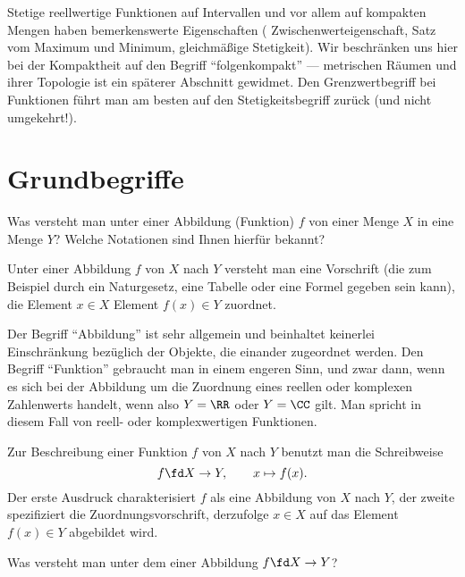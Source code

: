 Stetige reellwertige Funktionen auf Intervallen und vor allem auf  
kompakten Mengen haben bemerkenswerte Eigenschaften ({\zB} 
Zwischenwerteigenschaft, Satz vom Maximum und Minimum, 
gleichmäßige Stetigkeit). Wir beschränken uns hier bei der Kompaktheit 
auf den Begriff "`folgenkompakt"' --- metrischen Räumen und ihrer Topologie 
ist ein späterer Abschnitt gewidmet. Den Grenzwertbegriff bei Funktionen 
führt man am besten auf den Stetigkeitsbegriff zurück (und nicht umgekehrt!).  


\section{Grundbegriffe}

\begin{frage}
  \label{03_abdf}
  Was versteht man unter einer Abbildung (Funktion) $f$ von einer Menge 
  $X$ in eine Menge $Y$? Welche Notationen sind Ihnen hierfür bekannt?
\end{frage}

\begin{antwort}
  Unter einer Abbildung $f$ von $X$ nach $Y$ versteht man 
  eine Vorschrift 
  (die zum Beispiel durch ein Naturgesetz, 
  eine Tabelle oder eine Formel gegeben sein kann), die 
   Element $x\in X$  Element 
  $f(x) \in Y$ zuordnet. 

  Der Begriff "`Abbildung"' ist sehr allgemein und beinhaltet 
  keinerlei Einschränkung bezüglich der Objekte, die einander 
  zugeordnet werden. Den Begriff "`Funktion"' 
  gebraucht man in einem engeren Sinn, und zwar dann, wenn 
  es sich bei der Abbildung um die Zuordnung eines 
  reellen oder komplexen Zahlenwerts handelt, wenn also $Y=\RR$ 
  oder $Y=\CC$ gilt. Man spricht in diesem Fall von reell- oder 
  komplexwertigen Funktionen. 

  Zur Beschreibung einer Funktion $f$ von 
  $X$ nach $Y$ benutzt man die Schreibweise 
  \[
  f\fd X\to Y, \qquad x\mapsto f(x).
  \] 
  Der erste Ausdruck charakterisiert $f$ als eine Abbildung von $X$ nach $Y$, 
  der zweite spezifiziert die Zuordnungsvorschrift, derzufolge 
  $x\in X$ auf das Element $f(x)\in Y$ abgebildet wird. 
  \AntEnd
\end{antwort}

\begin{frage}
  \label{03_graf}
  Was versteht man unter dem  einer Abbildung $f\fd X\to Y$? 
\end{frage}

